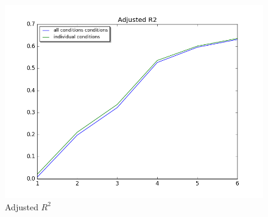 \begin{figure}
\begin{minipage}[b]{0.33\linewidth}
	\end{minipage}
		
	\begin{minipage}[b]{0.33\linewidth}
		\centering
		\includegraphics[width=.8\linewidth]{../images/adjr2_better}  
		\caption{Adjusted $R^2$}
		\label{fig:adjr2}

	\end{minipage}

\end{figure}

	

